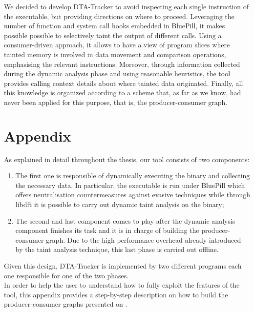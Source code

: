 \documentclass[LaM,binding=0.6cm]{sapthesis}
\begin{document}
We decided to develop DTA-Tracker to avoid inspecting each single instruction of the executable, but providing directions on where to proceed. Leveraging the number of function and system call hooks embedded in BluePill, it makes possible possible to selectively taint the output of different calls. Using a consumer-driven approach, it allows to have a view of program slices where tainted memory is involved in data movement and comparison operations, emphasising the relevant instructions. Moreover, through information collected during the dynamic analysis phase and using reasonable heuristics, the tool provides calling context details about where tainted data originated. Finally, all this knowledge is organized according to a scheme that, as far as we know, had never been applied for this purpose, that is, the producer-consumer graph.

\chapter*{Appendix}
As explained in detail throughout the thesis, our tool consists of two components:
\begin{enumerate}
\item The first one is responsible of dynamically executing the binary and collecting the necessary data. In particular, the executable is run under BluePill which offers neutralisation countermeasures against evasive techniques while through libdft it is possible to carry out dynamic taint analysis on the binary;
\item The second and last component comes to play after the dynamic analysis component finishes its task and it is in charge of building the producer-consumer graph. Due to the high performance overhead already introduced by the taint analysis technique, this last phase is carried out offline.
\end{enumerate}
Given this design, DTA-Tracker is implemented by two different programs each one responsible for one of the two phases.\\

In order to help the user to understand how to fully exploit the features of the tool, this appendix provides a step-by-step description on how to build the producer-consumer graphs presented on .\\
\end{document}
